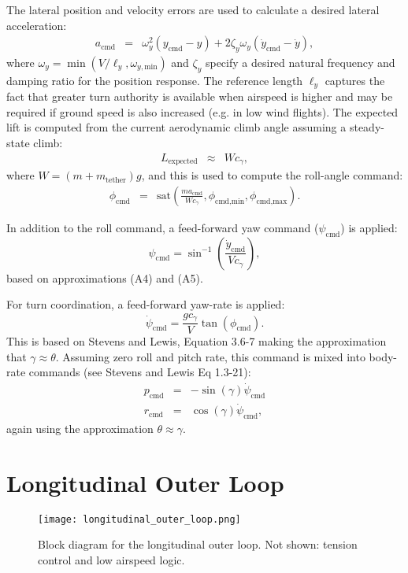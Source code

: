 \documentclass{article}
\newcommand{\rcmd}{r_{\textrm{cmd}}}
\newcommand{\acmd}{a_{\textrm{cmd}}}
\newcommand{\cgamma}{c_\gamma}
\newcommand{\ycmd}{y_\textrm{cmd}}
\newcommand{\dycmd}{\dot y_\textrm{cmd}}
\newcommand{\phicmd}{\phi_\textrm{cmd}}
\newcommand{\phicmdmin}{\phi_\textrm{cmd,min}}
\newcommand{\phicmdmax}{\phi_\textrm{cmd,max}}
\newcommand{\psicmd}{\psi_\textrm{cmd}}
\newcommand{\dpsicmd}{\dot \psi_\textrm{cmd}}
\newcommand{\pcmd}{p_\textrm{cmd}}
\newcommand{\rcmd}{r_\textrm{cmd}}
\newcommand{\mtether}{m_\textrm{tether}}
\newcommand{\sat}{\textrm{sat}}
\begin{document}
The lateral position and velocity errors are used to calculate a
desired lateral acceleration:
\begin{eqnarray}
\acmd &=& \omega_y^2 (\ycmd - y) + 2 \zeta_y \omega_y (\dycmd - \dot y),
\end{eqnarray}
where $\omega_y = \min\left(V / \ell_y,
\omega_{y,\textrm{min}}\right)$ and $\zeta_y$ specify a desired
natural frequency and damping ratio for the position response.  The
reference length $\ell_y$ captures the fact that greater turn
authority is available when airspeed is higher and may be required if
ground speed is also increased (e.g. in low wind flights). The expected
lift is computed from the current aerodynamic climb angle assuming a
steady-state climb:
\begin{eqnarray}
L_\textrm{expected} &\approx& W \cgamma,
\end{eqnarray}
where $W = (m + \mtether) g$, and this is used to compute the roll-angle command:
\begin{eqnarray}
\phicmd &=& \sat\left(\frac{m\acmd}{W \cgamma}, \phicmdmin, \phicmdmax\right).
\end{eqnarray}

In addition to the roll command, a feed-forward yaw command
($\psicmd$) is applied:
\begin{equation}
\psicmd = \sin^{-1}\left(\frac{\dycmd}{V\cgamma}\right),
\end{equation}
based on approximations (A4) and (A5).

For turn coordination, a feed-forward yaw-rate is applied:
\begin{equation}
\dpsicmd = \frac{g \cgamma}V \tan(\phicmd).
\end{equation}
This is based on Stevens and Lewis, Equation 3.6-7 making the
approximation that $\gamma \approx \theta$.  Assuming zero roll and
pitch rate, this command is mixed into body-rate commands (see Stevens and Lewis Eq 1.3-21):
\begin{eqnarray}
\pcmd &=& -\sin(\gamma) \dpsicmd \\
\rcmd &=& \cos(\gamma) \dpsicmd,
\end{eqnarray}
again using the approximation $\theta \approx \gamma$.


\section{Longitudinal Outer Loop}
\begin{figure}
\centering
\texttt{[image: longitudinal\_outer\_loop.png]}
\caption{Block diagram for the longitudinal outer loop.  Not shown:
  tension control and low airspeed logic.}
\end{figure}
\end{document}
